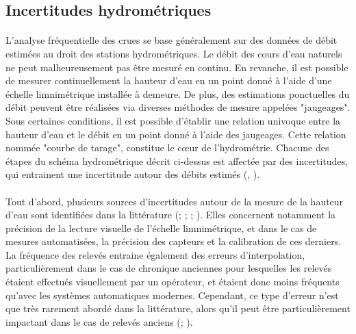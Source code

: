 \documentclass[11pt]{article}
\begin{document}
	\subsection{Incertitudes hydrométriques}
	
	\paragraph{} L'analyse fréquentielle des crues se base généralement sur des données de débit estimées au droit des stations hydrométriques. Le débit des cours d'eau naturels ne peut malheureusement pas être mesuré en continu. En revanche, il est possible de mesurer continuellement la hauteur d'eau en un point donné à l'aide d'une échelle limnimétrique installée à demeure. De plus, des estimations ponctuelles du débit peuvent être réalisées via diverses méthodes de mesure appelées "jaugeages". Sous certaines conditions, il est possible d'établir une relation univoque entre la hauteur d'eau et le débit en un point donné à l'aide des jaugeages. Cette relation nommée "courbe de tarage", constitue le cœur de l'hydrométrie. Chacune des étapes du schéma hydrométrique décrit ci-dessus est affectée par des incertitudes, qui entrainent une incertitude autour des débits estimés (\citet{mcmillan_benchmarking_2012}, \citet{puechberty_charte_2017}). 
	
	\paragraph{} Tout d'abord, plusieurs sources d'incertitudes autour de la mesure de la hauteur d'eau sont identifiées dans la littérature (\citet{van_der_made_determination_1982}; \citet{petersen-overleir_uncertainty_2005}; \citet{mcmillan_benchmarking_2012}; \citet{horner_impact_2018}). Elles concernent notamment la précision de la lecture visuelle de l'échelle limnimétrique, et dans le cas de mesures automatisées, la précision des capteurs et la calibration de ces derniers. La fréquence des relevés entraine également des erreurs d'interpolation, particulièrement dans le cas de chronique anciennes pour lesquelles les relevés étaient effectués visuellement par un opérateur, et étaient donc moins fréquents qu'avec les systèmes automatiques modernes. Cependant, ce type d'erreur n'est que très rarement abordé dans la littérature, alors qu'il peut être particulièrement impactant dans le cas de relevés anciens (\citet{hamilton_quantifying_2012}; \citet{kuentz_hydrometrie_2014}).
	
\end{document}
